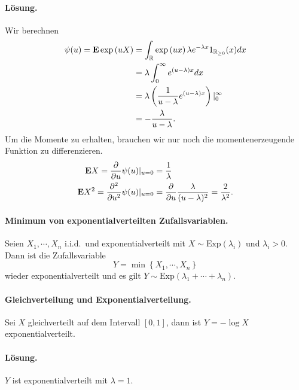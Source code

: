 \paragraph*{Lösung.} 
Wir berechnen
\begin{align*}
    \psi(u) = \mathbf{E} \exp \left( u X \right) &= 
    \int_{\mathbb R}^{} \exp \left( ux \right) \lambda e^{-\lambda x} 1_{\mathbb R_{\geq 0}}(x) dx \\
    &= \lambda \int_{0}^{\infty} e^{(u-\lambda)x} dx \\
    &= \lambda \left( \frac{1}{u-\lambda} e^{(u-\lambda)x} \right) |_{0}^{\infty}\\
    &= -\frac{\lambda}{u- \lambda}. 
\end{align*}
Um die Momente zu erhalten, brauchen wir nur noch die momentenerzeugende Funktion 
zu differenzieren. 
\begin{align*}
    \mathbf{E} X = \frac{\partial}{ \partial u} \psi (u) |_{u=0} &= \frac{1}{\lambda} \\
    \mathbf{E} X^2 = \frac{\partial^2}{\partial u^2} \psi (u) |_{u=0} &=
    \frac{\partial}{\partial u} \frac{\lambda}{(u-\lambda)^2} = \frac{2}{\lambda^2}. 
\end{align*}

\paragraph{Minimum von exponentialverteilten Zufallsvariablen.}
Seien $X_1, \cdots, X_n$ i.i.d.\ und exponentialverteilt mit $X\sim \text{Exp}(\lambda_i)$
und $\lambda_i>0$. Dann ist die Zufallsvariable 
\begin{equation*}
    Y = \min \left\{ X_1, \cdots, X_n \right\} 
\end{equation*}
wieder exponentialverteilt und es gilt $Y \sim
\text{Exp}(\lambda_1+\cdots+\lambda_n)$.

\paragraph{Gleichverteilung und Exponentialverteilung. } Sei $X$ gleichverteilt
auf dem Intervall $[0,1]$, dann ist $Y = -\log X$ exponentialverteilt.

\paragraph*{Lösung. } $Y$ ist exponentialverteilt mit $\lambda=1$.


